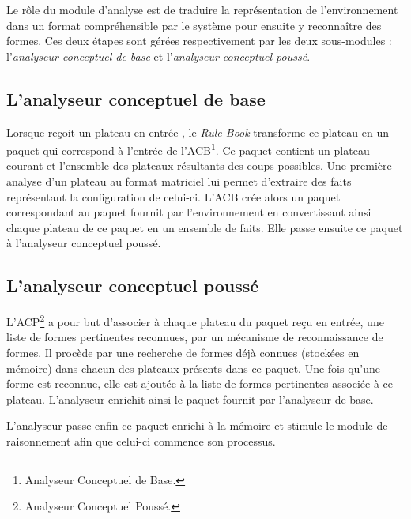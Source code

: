 Le rôle du module d'analyse est de traduire la représentation de l'environnement dans un format compréhensible par le système pour ensuite y reconnaître des formes. Ces deux étapes sont gérées respectivement par les deux sous-modules : l'\emph{analyseur conceptuel de base} et l'\emph{analyseur conceptuel poussé}.
\subsection{L'analyseur conceptuel de base}\label{def:analyseur de base}
Lorsque \cogito{} reçoit un plateau en entrée , le \emph{Rule-Book} transforme ce plateau en un paquet qui correspond à l'entrée de l'ACB\footnote{Analyseur Conceptuel de Base.}. Ce paquet contient un plateau courant et l'ensemble des plateaux résultants des coups possibles. Une première analyse d'un plateau au format matriciel lui permet d'extraire des faits représentant la configuration de celui-ci. L'ACB crée alors un paquet correspondant au paquet fournit par l'environnement en convertissant ainsi chaque plateau de ce paquet en un ensemble de faits. Elle passe ensuite ce paquet à l'analyseur conceptuel poussé. 
\subsection{L'analyseur conceptuel poussé}\label{def:analyseur pousse}
L'ACP\footnote{Analyseur Conceptuel Poussé.} a pour but d'associer à chaque plateau du paquet reçu en entrée, une liste de formes pertinentes reconnues, par un mécanisme de reconnaissance de formes. Il procède par une recherche de formes déjà connues (stockées en mémoire) dans chacun des plateaux présents dans ce paquet. Une fois qu'une forme est reconnue, elle est ajoutée à la liste de formes pertinentes associée à ce plateau. L'analyseur enrichit ainsi le paquet fournit par l'analyseur de base.

L'analyseur passe enfin ce paquet enrichi à la mémoire et stimule le module de raisonnement afin que celui-ci commence son processus. 